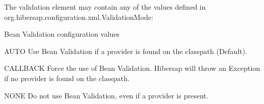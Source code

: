 The validation element may contain any of the values defined in \linebreak org.hibersap.configuration.xml.ValidationMode:\\

\begin{descriptionBlock}{Bean Validation configuration values}
\label{tab:BeanValidationConfigValues}
\item[AUTO] 
  Use Bean Validation if a provider is found on the classpath (Default).
\item[CALLBACK]
  Force the use of Bean Validation. Hibersap will throw an Exception if no provider is found on the classpath.
\item[NONE]
  Do not use Bean Validation, even if a provider is present.\\
\end{descriptionBlock}


